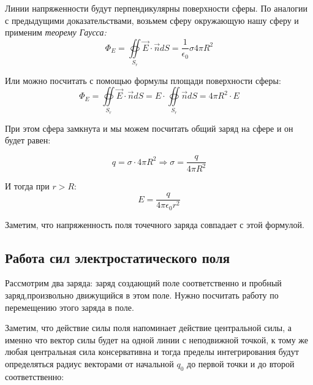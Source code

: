\documentclass[../main.tex]{subfiles}
\begin{document}
Линии напряженности будут перпендикулярны поверхности сферы.
По аналогии с предыдущими доказательствами, возьмем сферу окружающую нашу сферу и применим \textit{теорему Гаусса:}
\[\Phi_E = \oiint\limits_{S_r} \vec{E} \cdot  \vec{n} dS = \frac{1}{\epsilon_0}\sigma 4 \pi R^2\]

Или можно посчитать с помощью формулы площади поверхности сферы:
\[ \Phi_E = \oiint\limits_{S_r} \vec{E} \cdot \vec{n} dS = E \cdot \oiint\limits_{S_r} \vec{n} dS = 4 \pi R^2 \cdot E\]

При этом сфера замкнута и мы можем посчитать общий заряд на сфере и он будет равен:

\[ q = \sigma \cdot 4\pi R^2 \Rightarrow \sigma = \frac{q}{4\pi R^2}\]

И тогда при $r > R :$
\[ E = \frac{q}{4 \pi \epsilon_0 r^2} \]

Заметим, что напряженность поля точечного заряда совпадает с этой формулой.

\subsection{Работа сил электростатического поля}

Рассмотрим два заряда: заряд создающий поле соответственно и пробный заряд,произвольно движущийся в этом поле. Нужно посчитать работу по перемещению этого заряда в поле.

\vspace{5px}

Заметим, что действие силы поля напоминает действие центральной силы, а именно что вектор силы будет на одной линии с неподвижной точкой, к тому же любая центральная сила консервативна и тогда пределы интегрирования будут определяться радиус векторами от начальной $q_0$ до первой точки и до второй соответственно:
\end{document}
